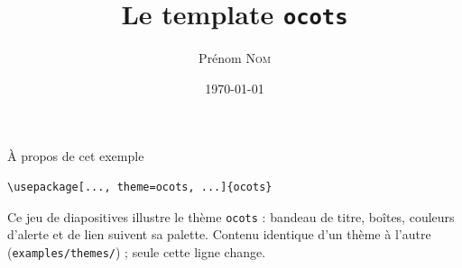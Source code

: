 \documentclass[9pt,t]{beamer}
\title{Le template \texttt{ocots}}
\author{Prénom \textsc{Nom}}
\date{\today}
\begin{document}
\slidetitlepage%

\begin{frame}[fragile]{\`A propos de cet exemple}
\begin{lstlisting}
\usepackage[..., theme=ocots, ...]{ocots}
\end{lstlisting}
Ce jeu de diapositives illustre le th\`eme \texttt{ocots} : bandeau de
titre, bo\^ites, couleurs d'alerte et de lien suivent sa palette. Contenu
identique d'un th\`eme \`a l'autre (\texttt{examples/themes/}) ; seule
cette ligne change.
\end{frame}


\end{document}
